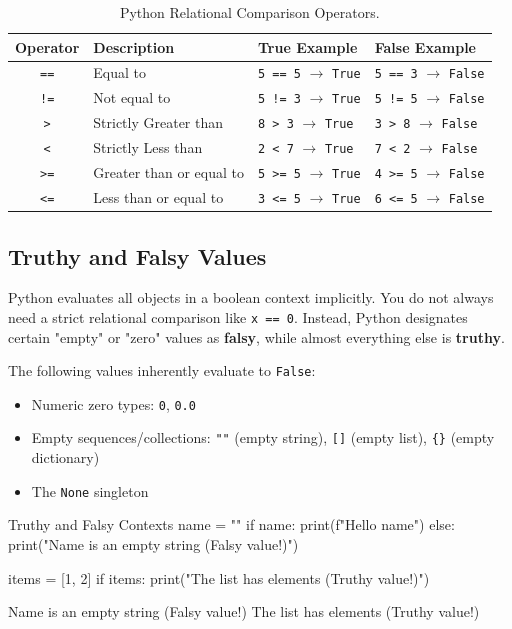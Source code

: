\begin{table}[htbp]
\centering
\small
\renewcommand{\arraystretch}{1.2}
\begin{tabularx}{\linewidth}{cllX}
\toprule
\textbf{Operator} & \textbf{Description} & \textbf{True Example} & \textbf{False Example} \\
\midrule
\texttt{==} & Equal to & \texttt{5 == 5} $\to$ \texttt{True} & \texttt{5 == 3} $\to$ \texttt{False} \\
\texttt{!=} & Not equal to & \texttt{5 != 3} $\to$ \texttt{True} & \texttt{5 != 5} $\to$ \texttt{False} \\
\texttt{>} & Strictly Greater than & \texttt{8 > 3} $\to$ \texttt{True} & \texttt{3 > 8} $\to$ \texttt{False} \\
\texttt{<} & Strictly Less than & \texttt{2 < 7} $\to$ \texttt{True} & \texttt{7 < 2} $\to$ \texttt{False} \\
\texttt{>=} & Greater than or equal to & \texttt{5 >= 5} $\to$ \texttt{True} & \texttt{4 >= 5} $\to$ \texttt{False} \\
\texttt{<=} & Less than or equal to & \texttt{3 <= 5} $\to$ \texttt{True} & \texttt{6 <= 5} $\to$ \texttt{False} \\
\bottomrule
\end{tabularx}
\caption{Python Relational Comparison Operators.}
\label{tab:relational-ops}
\end{table}

\subsection{Truthy and Falsy Values}

Python evaluates all objects in a boolean context implicitly. You do not always need a strict relational comparison like \texttt{x == 0}. Instead, Python designates certain "empty" or "zero" values as \textbf{falsy}, while almost everything else is \textbf{truthy}.

The following values inherently evaluate to \texttt{False}:
\begin{itemize}
    \item Numeric zero types: \texttt{0}, \texttt{0.0}
    \item Empty sequences/collections: \texttt{""} (empty string), \texttt{[]} (empty list), \texttt{\{\}} (empty dictionary)
    \item The \texttt{None} singleton
\end{itemize}

\begin{pythoncode}{Truthy and Falsy Contexts}
name = ""
if name:
    print(f"Hello {name}")
else:
    print("Name is an empty string (Falsy value!)")

items = [1, 2]
if items:
    print("The list has elements (Truthy value!)")
\end{pythoncode}
\begin{outputbox}
Name is an empty string (Falsy value!)
The list has elements (Truthy value!)
\end{outputbox}

